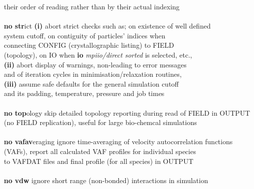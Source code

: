 \begin{tabbing}
\>                                              \> their order of reading rather than by their actual indexing \\
\>                                              \> \\
\> {\bf no str}ict                              \> {\bf (i)} abort strict checks such as; on existence of well defined \\
\>                                              \> system cutoff, on contiguity of particles' indices when \\
\>                                              \> connecting CONFIG (crystallographic listing) to FIELD \\
\>                                              \> (topology), on IO when {\bf io} {\em mpiio/direct sorted} is selected, etc., \\
\>                                              \> {\bf (ii)} abort display of warnings, non-leading to error messages \\
\>                                              \> and of iteration cycles in minimisation/relaxation routines, \\
\>                                              \> {\bf (iii)} assume safe defaults for the general simulation cutoff \\
\>                                              \> and its padding, temperature, pressure and job times \\
\>                                              \> \\
\> {\bf no top}ology                            \> skip detailed topology reporting during read of FIELD in OUTPUT \\
\>                                              \> (no FIELD replication), useful for large bio-chemcal simulations \\
\>                                              \> \\
\> {\bf no vafav}eraging                        \> ignore time-averaging of velocity autocorrelation functions \\
\>                                              \> (VAFs), report all calculated VAF profiles for individual species \\
\>                                              \> to VAFDAT files and final profile (for all species) in OUTPUT \\
\>                                              \> \\
\> {\bf no vdw}                                 \> ignore short range (non-bonded) interactions in simulation \\

\end{tabbing}
